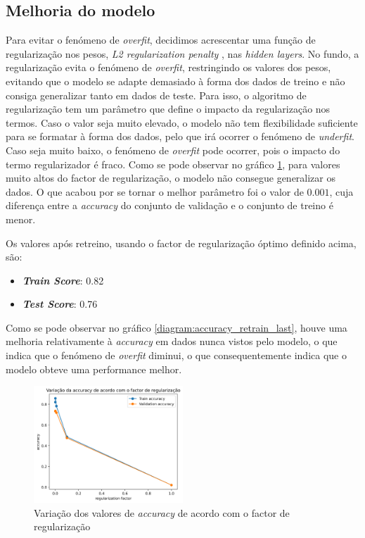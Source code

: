\subsection{Melhoria do modelo}

Para evitar o fenómeno de \textit{overfit}, decidimos acrescentar uma função de regularização nos pesos, \textit{L2 regularization penalty} \cite{l2_regularizer}, nas \textit{hidden layers}. No fundo, a regularização evita o fenómeno de \textit{overfit}, restringindo os valores dos pesos, evitando que o modelo se adapte demasiado à forma dos dados de treino e não consiga generalizar tanto em dados de teste.
Para isso, o algoritmo de regularização tem um parâmetro que define o impacto da regularização nos termos. Caso o valor seja muito elevado, o modelo não tem flexibilidade suficiente para se formatar à forma dos dados, pelo que irá ocorrer o fenómeno de \textit{underfit}. Caso seja muito baixo, o fenómeno de \textit{overfit} pode ocorrer, pois o impacto do termo regularizador é fraco.
Como se pode observar no gráfico \ref{diagram:reg_factor}, para valores muito altos do factor de regularização, o modelo não consegue generalizar os dados. O que acabou por se tornar o melhor parâmetro foi o valor de $0.001$, cuja diferença entre a \textit{accuracy} do conjunto de validação e o conjunto de treino é menor.

Os valores após retreino, usando o factor de regularização óptimo definido acima, são:
\begin{itemize}
        \item \textbf{\textit{Train Score}}: 0.82
        \item \textbf{\textit{Test Score}}: 0.76
\end{itemize}

Como se pode observar no gráfico \ref{diagram:accuracy_retrain_last}, houve uma melhoria relativamente à \textit{accuracy} em dados nunca vistos pelo modelo, o que indica que o fenómeno de \textit{overfit} diminui, o que consequentemente indica que o modelo obteve uma performance melhor.



\begin{figure}[t]
\begin{center}
\includegraphics[width=0.5\textwidth,keepaspectratio]{figures/r_Factor.png}
\caption{Variação dos valores de \textit{accuracy} de acordo com o factor de regularização}
\label{diagram:reg_factor}
\centering
\end{center}
\end{figure}


